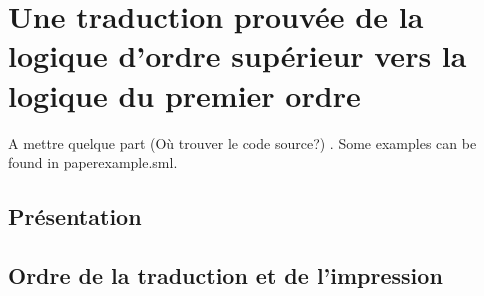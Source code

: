 \section{Une traduction prouvée de la logique d'ordre supérieur vers la
  logique du premier ordre}
 
A mettre quelque part (Où trouver le code source?)
. Some examples can be found in paperexample.sml.

\subsection{Présentation}

\subsection{Ordre de la traduction et de l'impression}

